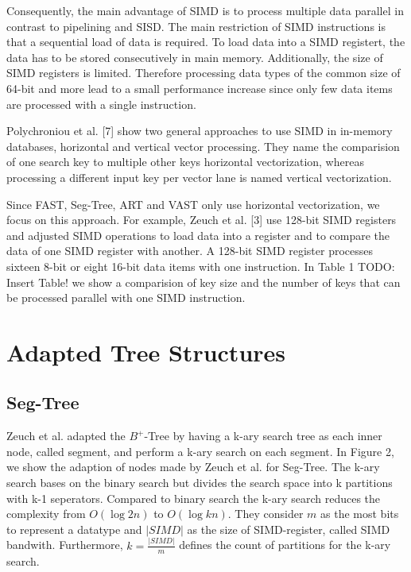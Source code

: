 \documentclass[conference]{IEEEtran}
\begin{document}
Consequently, the main advantage of SIMD is to process multiple data parallel in contrast to pipelining and SISD. The main restriction of SIMD instructions is that a sequential load of data is required. To load data into a SIMD registert, the data has to be stored consecutively in main memory. Additionally, the size of SIMD registers is limited. Therefore processing data types of the common size of 64-bit and more lead to a small performance increase since only few data items are processed with a single instruction.

Polychroniou et al. [7] show two general approaches to use SIMD in in-memory databases, horizontal and vertical vector processing. They name the comparision of one search key to multiple other keys horizontal vectorization, whereas processing a different input key per vector lane is named vertical vectorization.

Since FAST, Seg-Tree, ART and VAST only use horizontal vectorization, we focus on this approach.  For example, Zeuch et al. [3] use 128-bit SIMD registers and adjusted SIMD operations to load data into a register and to compare the data of one SIMD register with another. A 128-bit SIMD register processes sixteen 8-bit or eight 16-bit data items with one instruction. In Table 1 TODO: Insert Table! we show a comparision of key size and the number of keys that can be processed parallel with one SIMD instruction.


\section{Adapted Tree Structures}
\subsection{Seg-Tree}\label{SCM}
Zeuch et al. adapted the $B^+$-Tree by having a k-ary search tree as each inner node, called segment, and perform a k-ary search on each segment.  In Figure 2, we show the adaption of nodes made by Zeuch et al. for Seg-Tree. The k-ary search bases on the binary search but divides the search space into k partitions with k-1 seperators. Compared to binary search the k-ary search reduces the complexity from $O(\log{2}{n})$ to $O(\log{k}{n})$. They consider $m$ as the most bits to represent a datatype and $\vert SIMD \vert$ as the size of SIMD-register, called SIMD bandwith. Furthermore, $k = \frac{\vert SIMD \vert }{m}$ defines the count of partitions for the k-ary search. 
\end{document}
